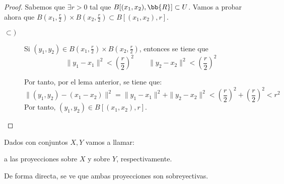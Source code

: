 \begin{proof}
    Sabemos que $\exists r>0$ tal que $B[(x_1,x_2),\bb{R}]\subset U$. Vamos a probar ahora que $B\left(x_1,\frac{r}{2}\right)\times B\left(x_2,\frac{r}{2}\right)\subset B[(x_1,x_2),r]$.
    \begin{description}
        \item[$\subset)$] Si $(y_1,y_2)\in B\left(x_1,\frac{r}{2}\right)\times B\left(x_2,\frac{r}{2}\right)$, entonces se tiene que
        \begin{equation*}
            \|y_1-x_1\|^2 < \left(\frac{r}{2}\right)^2
            \qquad
            \|y_2-x_2\|^2 < \left(\frac{r}{2}\right)^2
        \end{equation*}

        Por tanto, por el lema anterior, se tiene que:
        \begin{equation*}
            \|(y_1, y_2) - (x_1-x_2)\|^2 = \|y_1-x_1\|^2 + \|y_2-x_2\|^2 <  \left(\frac{r}{2}\right)^2 + \left(\frac{r}{2}\right)^2 < r^2
        \end{equation*}
        Por tanto, $(y_1,y_2)\in B[(x_1,x_2), r]$.
    \end{description}
\end{proof}

\begin{definicion}[Proyección]
    Dados con conjuntos $X,Y$ vamos a llamar:
    \begin{figure}[H]
        \begin{subfigure}{0.45\linewidth}
            \centering
        \end{subfigure}
        \begin{subfigure}{0.45\linewidth}
            \centering
        \end{subfigure}
    \end{figure}

    a las proyecciones sobre $X$ y sobre $Y$, respectivamente.
\end{definicion}
De forma directa, se ve que ambas proyecciones son sobreyectivas.

